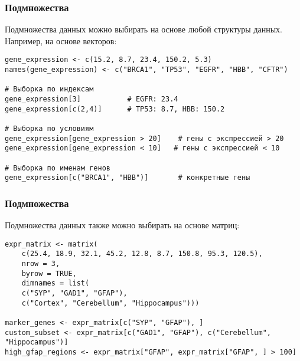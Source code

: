 \documentclass[10pt]{beamer}
\begin{document}
	
	\begin{frame}[fragile]
		\frametitle{Подмножества}
		Подмножества данных можно выбирать на основе любой структуры данных. Например, на основе векторов:
		{\fontsize{8}{9}\selectfont
			
			
				\begin{verbatim}
gene_expression <- c(15.2, 8.7, 23.4, 150.2, 5.3)
names(gene_expression) <- c("BRCA1", "TP53", "EGFR", "HBB", "CFTR")
					
# Выборка по индексам
gene_expression[3]           # EGFR: 23.4
gene_expression[c(2,4)]      # TP53: 8.7, HBB: 150.2
					
# Выборка по условиям
gene_expression[gene_expression > 20]    # гены с экспрессией > 20
gene_expression[gene_expression < 10]   # гены с экспрессией < 10
					
# Выборка по именам генов
gene_expression[c("BRCA1", "HBB")]       # конкретные гены\end{verbatim}
			
}
		
		
	\end{frame}
	
	\begin{frame}[fragile]
		\frametitle{Подмножества}
		Подмножества данных также можно выбирать на основе матриц:
		{\fontsize{8}{9}\selectfont
			
				\begin{verbatim}
expr_matrix <- matrix(
    c(25.4, 18.9, 32.1, 45.2, 12.8, 8.7, 150.8, 95.3, 120.5), 
    nrow = 3,
    byrow = TRUE,
    dimnames = list(
    c("SYP", "GAD1", "GFAP"), 
    c("Cortex", "Cerebellum", "Hippocampus")))
					
marker_genes <- expr_matrix[c("SYP", "GFAP"), ]
custom_subset <- expr_matrix[c("GAD1", "GFAP"), c("Cerebellum", "Hippocampus")]
high_gfap_regions <- expr_matrix["GFAP", expr_matrix["GFAP", ] > 100]          
					
				\end{verbatim}
		}
		
		
	\end{frame}
	
\end{document}
